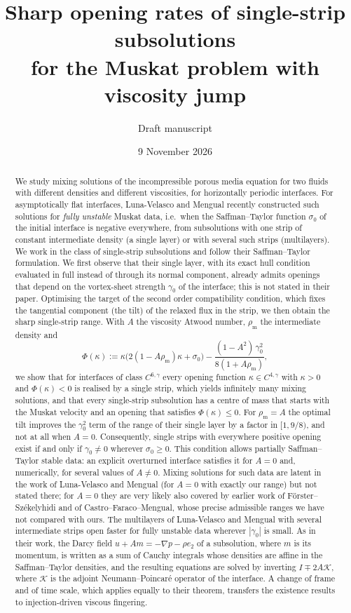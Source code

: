 \documentclass[11pt,a4paper]{amsart}
\title[Sharp single-strip opening rates for the Muskat problem with viscosity jump]{Sharp opening rates of single-strip subsolutions\\ for the Muskat problem with viscosity jump}
\author{Draft manuscript}
\date{9 November 2026}
\numberwithin{equation}{section}
\theoremstyle{definition}
\theoremstyle{remark}
\newcommand{\Kop}{\mathcal{K}}
\newcommand{\ee}{e_2}
\newcommand{\sig}{\sigma}
\newcommand{\rhom}{\rho_{\mathrm m}}
\begin{document}
\begin{abstract}
We study mixing solutions of the incompressible porous media equation for two fluids with different densities and different viscosities, for horizontally
periodic interfaces. For asymptotically flat interfaces, Luna-Velasco and Mengual recently constructed such solutions for \emph{fully unstable} Muskat data,
i.e.\ when the Saffman--Taylor function $\sig_0$ of the initial interface is negative everywhere, from subsolutions with one strip of constant intermediate
density (a single layer) or with several such strips (multilayers). We work in the class of single-strip subsolutions and follow their Saffman--Taylor
formulation. We first observe that their single layer, with its exact hull condition evaluated in full instead of through its normal component, already
admits openings that depend on the vortex-sheet strength $\gamma_0$ of the interface; this is not stated in their paper. Optimising the target of the second
order compatibility condition, which fixes the tangential component (the tilt) of the relaxed flux in the strip, we then obtain the sharp single-strip
range. With $A$ the viscosity Atwood number, $\rhom$ the intermediate density and
\[
\Phi(\kappa):=\kappa\big(2(1-A\rhom)\kappa+\sig_0\big)-\frac{(1-A^2)\,\gamma_0^2}{8(1+A\rhom)},
\]
we show that for interfaces of class $C^{6,\gamma}$ every opening function $\kappa\in C^{4,\gamma}$ with $\kappa>0$ and $\Phi(\kappa)<0$ is realised by a
single strip, which yields infinitely many mixing solutions, and that every single-strip subsolution has a centre of mass that starts with the Muskat
velocity and an opening that satisfies $\Phi(\kappa)\le0$. For $\rhom=A$ the optimal tilt improves the $\gamma_0^2$ term of the range of their single
layer by a factor in $[1,9/8)$, and not at all when $A=0$. Consequently, single strips with everywhere positive opening exist if and only if $\gamma_0\ne0$
wherever $\sig_0\ge0$. This condition allows partially Saffman--Taylor stable data: an explicit overturned interface satisfies it for $A=0$ and,
numerically, for several values of $A\ne0$. Mixing solutions for such data are latent in the work of Luna-Velasco and Mengual (for $A=0$ with exactly our
range) but not stated there; for $A=0$ they are very likely also covered by earlier work of F\"orster--Sz\'ekelyhidi and of Castro--Faraco--Mengual, whose
precise admissible ranges we have not compared with ours. The multilayers of Luna-Velasco and Mengual with several intermediate strips open faster for fully
unstable data wherever $|\gamma_0|$ is small. As in their work, the Darcy field
$u+Am=-\nabla p-\rho\ee$ of a subsolution, where $m$ is its momentum, is written as a sum of Cauchy integrals whose densities are affine in the
Saffman--Taylor densities, and the resulting equations are solved by inverting $I\mp2A\Kop$, where $\Kop$ is the adjoint Neumann--Poincar\'e operator of
the interface. A change of frame and of time scale, which applies equally to their theorem, transfers the existence results to injection-driven viscous
fingering.
\end{abstract}
\end{document}
